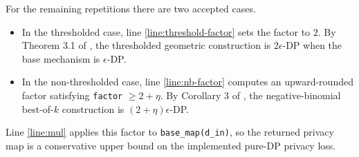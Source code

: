 \documentclass{article}
\begin{document}
For the remaining repetitions there are two accepted cases.
\begin{itemize}
    \item In the thresholded case, line \ref{line:threshold-factor} sets the factor to $2$.
    By Theorem 3.1 of \cite{liu2018privateselectionprivatecandidates}, the thresholded geometric
    construction is $2\epsilon$-DP when the base mechanism is $\epsilon$-DP.
    \item In the non-thresholded case, line \ref{line:nb-factor} computes an upward-rounded factor
    satisfying \texttt{factor} $\ge 2 + \eta$.
    By Corollary 3 of \cite{papernot2021hyperparametertuningrenyidifferentialprivacy}, the
    negative-binomial best-of-$k$ construction is $(2 + \eta)\epsilon$-DP.
\end{itemize}

Line \ref{line:mul} applies this factor to \texttt{base\_map(d\_in)}, so the returned privacy map
is a conservative upper bound on the implemented pure-DP privacy loss.



\end{document}
